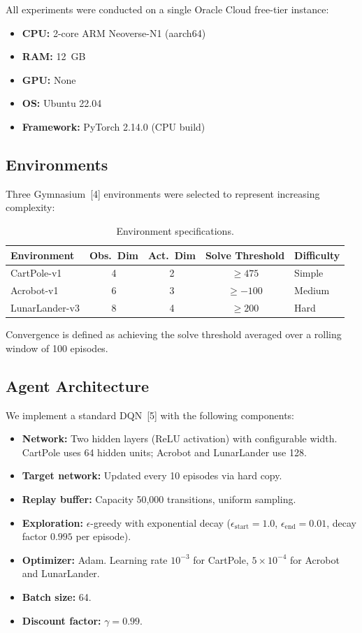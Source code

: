\documentclass[11pt,a4paper]{article}
\begin{document}
All experiments were conducted on a single Oracle Cloud free-tier instance:
\begin{itemize}
    \item \textbf{CPU:} 2-core ARM Neoverse-N1 (aarch64)
    \item \textbf{RAM:} 12~GB
    \item \textbf{GPU:} None
    \item \textbf{OS:} Ubuntu 22.04
    \item \textbf{Framework:} PyTorch 2.14.0 (CPU build)
\end{itemize}

\subsection{Environments}

Three Gymnasium~[4] environments were selected to represent increasing complexity:

\begin{table}[H]
\centering
\caption{Environment specifications.}
\begin{tabular}{lcccl}
\toprule
\textbf{Environment} & \textbf{Obs.\ Dim} & \textbf{Act.\ Dim} & \textbf{Solve Threshold} & \textbf{Difficulty} \\
\midrule
CartPole-v1 & 4 & 2 & $\geq 475$ & Simple \\
Acrobot-v1 & 6 & 3 & $\geq -100$ & Medium \\
LunarLander-v3 & 8 & 4 & $\geq 200$ & Hard \\
\bottomrule
\end{tabular}
\end{table}

Convergence is defined as achieving the solve threshold averaged over a rolling window of 100 episodes.

\subsection{Agent Architecture}

We implement a standard DQN~[5] with the following components:
\begin{itemize}
    \item \textbf{Network:} Two hidden layers (ReLU activation) with configurable width. CartPole uses 64 hidden units; Acrobot and LunarLander use 128.
    \item \textbf{Target network:} Updated every 10 episodes via hard copy.
    \item \textbf{Replay buffer:} Capacity 50,000 transitions, uniform sampling.
    \item \textbf{Exploration:} $\epsilon$-greedy with exponential decay ($\epsilon_{\text{start}}=1.0$, $\epsilon_{\text{end}}=0.01$, decay factor $0.995$ per episode).
    \item \textbf{Optimizer:} Adam. Learning rate $10^{-3}$ for CartPole, $5 \times 10^{-4}$ for Acrobot and LunarLander.
    \item \textbf{Batch size:} 64.
    \item \textbf{Discount factor:} $\gamma = 0.99$.
\end{itemize}
\end{document}

